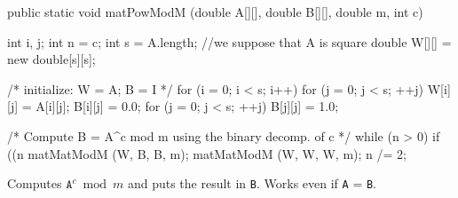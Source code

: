 \begin{code}

   public static void matPowModM (double A[][], double B[][], double m,
                                  int c) \begin{hide} {
      int i, j;
      int n = c;
      int s = A.length;   //we suppose that A is square
      double W[][] = new double[s][s];

      /* initialize: W = A; B = I */
      for (i = 0; i < s; i++) {
         for (j = 0; j < s;  ++j)  {
            W[i][j] = A[i][j];
            B[i][j] = 0.0;
         }
      }
      for (j = 0; j < s;  ++j)
         B[j][j] = 1.0;

      /* Compute B = A^c mod m using the binary decomp. of c */
      while (n > 0) {
         if ((n %
            matMatModM (W, B, B, m);
         matMatModM (W, W, W, m);
         n /= 2;
      }
   } \end{hide}
\end{code}
\begin{tabb} Computes $\mathtt{A}^{c} \bmod m$ 
  and puts the result in \texttt{B}.
  Works even if \texttt{A} = \texttt{B}.
\end{tabb}
\begin{htmlonly}
\end{htmlonly}



